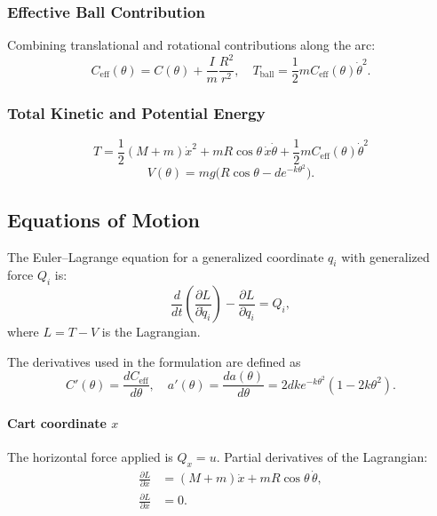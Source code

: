 \subsubsection{Effective Ball Contribution}
Combining translational and rotational contributions along the arc:
\begin{equation}
C_\mathrm{eff}(\theta) = C(\theta) + \frac{I}{m} \frac{R^2}{r^2}, \quad
T_\text{ball} = \frac{1}{2} m C_\mathrm{eff}(\theta) \dot\theta^2.
\end{equation}

\subsubsection{Total Kinetic and Potential Energy}
\begin{equation}
\boxed{
T = \frac{1}{2}(M+m)\dot x^2 + m R \cos\theta \, \dot x \dot\theta + \frac{1}{2} m C_\mathrm{eff}(\theta) \dot\theta^2
}
\end{equation}
\begin{equation}
\boxed{V(\theta) = mg \big(R \cos\theta - d e^{-k\theta^2} \big).}
\end{equation}

\subsection{Equations of Motion}
The Euler--Lagrange equation for a generalized coordinate $q_i$ with generalized force $Q_i$ is:
\begin{equation}
\frac{d}{dt} \left( \frac{\partial L}{\partial \dot{q}_i} \right) - \frac{\partial L}{\partial q_i} = Q_i,
\label{eq:euler-lagrange}
\end{equation}
where $L = T - V$ is the Lagrangian.

The derivatives used in the formulation are defined as
\begin{equation}
C'(\theta) = \frac{d C_\mathrm{eff}}{d\theta}, \quad
a'(\theta) = \frac{d a(\theta)}{d\theta} = 2 d k e^{-k\theta^2} (1 - 2 k \theta^2).
\end{equation}

\paragraph{Cart coordinate $x$}  
The horizontal force applied is $Q_x = u$. Partial derivatives of the Lagrangian:
\begin{equation}
\begin{split}
\frac{\partial L}{\partial \dot{x}} &= (M+m)\dot{x} + m R \cos\theta \, \dot\theta, \\
\frac{\partial L}{\partial x} &= 0.
\end{split}
\end{equation}

